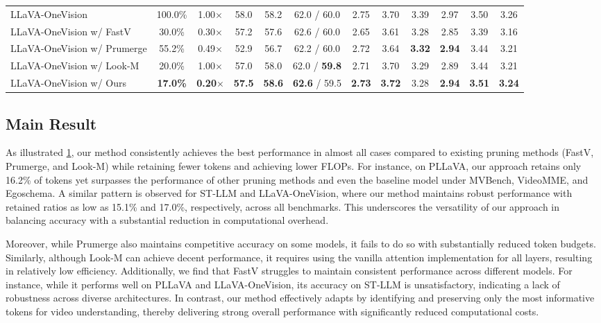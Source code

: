 \documentclass{article} %
\begin{document}
\begin{table}[t]
\begin{tabular}{@{}lccccc|cccccc@{}}
\midrule
LLaVA-OneVision                 & 100.0\% & 1.00$\times$ & 58.0  & 58.2  & 62.0 / 60.0 & 2.75 & 3.70 & 3.39 & 2.97 & 3.50 & 3.26 \\
LLaVA-OneVision w/ FastV        & 30.0\%  & 0.30$\times$ & 57.2  & 57.6  & 62.6 / 60.0 & 2.65 & 3.61 & 3.28 & 2.85 & 3.39 & 3.16 \\
LLaVA-OneVision w/ Prumerge     & 55.2\%  & 0.49$\times$ & 52.9  & 56.7  & 62.2 / 60.0 & 2.72 & 3.64 & \textbf{3.32} & \textbf{2.94} & 3.44 & 3.21 \\
LLaVA-OneVision w/ Look-M       & 20.0\%  & 1.00$\times$ & 57.0  & 58.0  & 62.0 / \textbf{59.8} & 2.71 & 3.70 & 3.29 & 2.89 & 3.44 & 3.21 \\
\rowcolor[HTML]{E3F2FD} LLaVA-OneVision w/ Ours      & \textbf{17.0\%}  & \textbf{0.20$\times$} & \textbf{57.5}  & \textbf{58.6}  & \textbf{62.6} / 59.5 & \textbf{2.73} & \textbf{3.72} & 3.28 & \textbf{2.94} & \textbf{3.51} & \textbf{3.24} \\
\bottomrule
\end{tabular}
\label{tab:main result}
\end{table}

\subsection{Main Result}
As illustrated \cref{tab:main result}, our method consistently achieves the best performance in almost all cases compared to existing pruning methods (FastV, Prumerge, and Look-M) while retaining fewer tokens and achieving lower FLOPs. For instance, on PLLaVA, our approach retains only 16.2\% of tokens yet surpasses the performance of other pruning methods and even the baseline model under MVBench, VideoMME, and Egoschema. A similar pattern is observed for ST-LLM and LLaVA-OneVision, where our method maintains robust performance with retained ratios as low as 15.1\% and 17.0\%, respectively, across all benchmarks. This underscores the versatility of our approach in balancing accuracy with a substantial reduction in computational overhead.

Moreover, while Prumerge also maintains competitive accuracy on some models, it fails to do so with substantially reduced token budgets. Similarly, although Look-M can achieve decent performance, it requires using the vanilla attention implementation for all layers, resulting in relatively low efficiency. Additionally, we find that FastV struggles to maintain consistent performance across different models. For instance, while it performs well on PLLaVA and LLaVA-OneVision, its accuracy on ST-LLM is unsatisfactory, indicating a lack of robustness across diverse architectures. In contrast, our method effectively adapts by identifying and preserving only the most informative tokens for video understanding, thereby delivering strong overall performance with significantly reduced computational costs.
\end{document}
